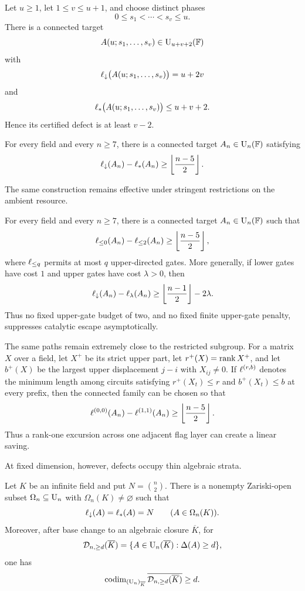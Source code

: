\begin{theorem}\label{thm:snapshot-family}
Let $u\ge1$, let $1\le v\le u+1$, and choose distinct phases
\[
0\le s_1<\cdots<s_v\le u.
\]
There is a connected target
\[
A(u;s_1,\ldots,s_v)\in\operatorname{U}_{u+v+2}(\mathbb F)
\]
with
\[
\ell_{\downarrow}\bigl(A(u;s_1,\ldots,s_v)\bigr)=u+2v
\]
and
\[
\ell_{*}\bigl(A(u;s_1,\ldots,s_v)\bigr)\le u+v+2.
\]
Hence its certified defect is at least $v-2$.
\end{theorem}

\begin{corollary}\label{cor:connected-gap}
For every field and every $n\ge7$, there is a connected target $A_n\in\operatorname{U}_n(\mathbb F)$ satisfying
\[
\ell_{\downarrow}(A_n)-\ell_{*}(A_n)
\ge
\left\lfloor\frac{n-5}{2}\right\rfloor.
\]
\end{corollary}

The same construction remains effective under stringent restrictions on the ambient resource.

\begin{theorem}\label{thm:resource-robustness}
For every field and every $n\ge7$, there is a connected target $A_n\in\operatorname{U}_n(\mathbb F)$ such that
\[
\ell_{\le 0}(A_n)-\ell_{\le 2}(A_n)
\ge
\left\lfloor\frac{n-5}{2}\right\rfloor,
\]
where $\ell_{\le q}$ permits at most $q$ upper-directed gates.  More generally, if lower gates have cost $1$ and upper gates have cost $\lambda>0$, then
\[
\ell_{\downarrow}(A_n)-\ell_{\lambda}(A_n)
\ge
\left\lfloor\frac{n-1}{2}\right\rfloor-2\lambda.
\]
Thus no fixed upper-gate budget of two, and no fixed finite upper-gate penalty, suppresses catalytic escape asymptotically.
\end{theorem}

The same paths remain extremely close to the restricted subgroup.  For a matrix $X$ over a field, let $X^+$ be its strict upper part, let $r^+(X)=\operatorname{rank} X^+$, and let $b^+(X)$ be the largest upper displacement $j-i$ with $X_{ij}\ne0$.  If $\ell^{(r,b)}$ denotes the minimum length among circuits satisfying $r^+(X_t)\le r$ and $b^+(X_t)\le b$ at every prefix, then the connected family can be chosen so that
\[
\ell^{(0,0)}(A_n)-\ell^{(1,1)}(A_n)
\ge
\left\lfloor\frac{n-5}{2}\right\rfloor.
\]
Thus a rank-one excursion across one adjacent flag layer can create a linear saving.

At fixed dimension, however, defects occupy thin algebraic strata.

\begin{theorem}\label{thm:generic-rigidity-intro}
Let $K$ be an infinite field and put $N=\binom n2$.  There is a nonempty Zariski-open subset $\Omega_n\subseteq\operatorname{U}_n$ with $\Omega_n(K)\ne\varnothing$ such that
\[
\ell_{\downarrow}(A)=\ell_{*}(A)=N
\qquad(A\in\Omega_n(K)).
\]
Moreover, after base change to an algebraic closure $\overline K$, for
\[
\mathcal D_{n,\ge d}(\overline K)
=\{A\in\operatorname{U}_n(\overline K):\Delta(A)\ge d\},
\]
one has
\[
\operatorname{codim}_{(\operatorname{U}_n)_{\overline K}}
\overline{\mathcal D_{n,\ge d}(\overline K)}\ge d.
\]
\end{theorem}

